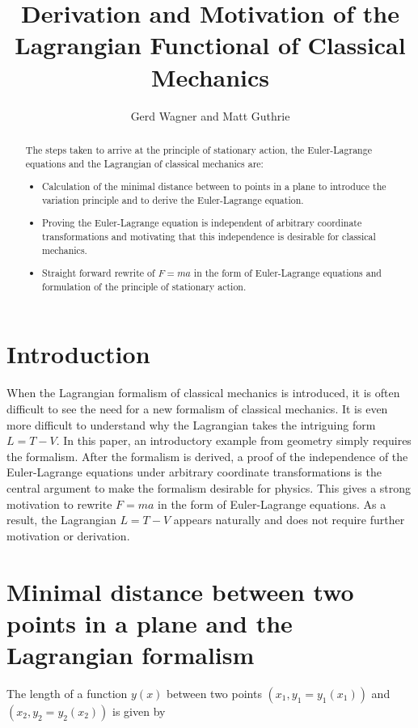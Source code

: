 \documentclass{article}
\begin{document}
\title{Derivation and Motivation of the Lagrangian Functional of Classical Mechanics}
\author{Gerd Wagner and Matt Guthrie}

\maketitle

\begin{abstract} %
The steps taken to arrive at the principle of stationary action, the Euler-Lagrange equations and the Lagrangian of classical mechanics are:
\begin{itemize}
\item Calculation of the minimal distance between to points in a plane to introduce the variation principle and to derive the Euler-Lagrange equation.
\item Proving the Euler-Lagrange equation is independent of arbitrary coordinate transformations and motivating that this independence is desirable for classical mechanics.
\item Straight forward rewrite of $F=ma$ in the form of Euler-Lagrange equations and formulation of the principle of stationary action.
\end{itemize}
\end{abstract}


\section{Introduction}

When the Lagrangian formalism of classical mechanics is introduced, it is often difficult to see the need for a new formalism of classical mechanics. It is even more difficult to understand why the Lagrangian takes the intriguing form $L=T-V$. In this paper, an introductory example from geometry simply requires the formalism. After the formalism is derived, a proof of the independence of the Euler-Lagrange equations under arbitrary coordinate transformations is the central argument to make the formalism desirable for physics. This gives a strong motivation to rewrite $F=ma$ in the form of Euler-Lagrange equations. As a result, the Lagrangian $L=T-V$ appears naturally and does not require further motivation or derivation.

\section{Minimal distance between two points in a plane and the Lagrangian formalism \cite{Klopper}}\label{distance}
The length %
of a function $y(x)$ between two points $(x_1,y_1=y_1(x_1))$ and $(x_2,y_2=y_2(x_2))$ %
is given by 
\end{document}
